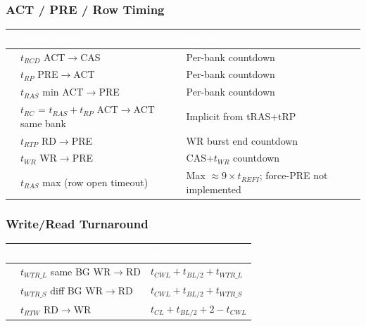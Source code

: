 \documentclass[11pt,a4paper]{article}
\newcommand{\THead}[1]{\cellcolor{navy}\textcolor{white}{\small\textbf{#1}}}
\newcommand{\RA}{\rowcolor{lgray}}
\newcommand{\RB}{\rowcolor{sky!30}}
\newcommand{\cmark}{\textcolor{grn}{\ding{51}}}
\newcommand{\xmark}{\textcolor{red}{\ding{55}}}
\begin{document}
\subsubsection*{ACT / PRE / Row Timing}
\begin{center}
\begin{tabularx}{\linewidth}{@{} c l X @{}}
\toprule
\THead{} & \THead{Constraint} & \THead{Notes} \\
\midrule
\RA\cmark & $t_{RCD}$ ACT$\to$CAS & Per-bank countdown \\
\RB\cmark & $t_{RP}$ PRE$\to$ACT & Per-bank countdown \\
\RA\cmark & $t_{RAS}$ min ACT$\to$PRE & Per-bank countdown \\
\RB\cmark & $t_{RC}$ = $t_{RAS}+t_{RP}$ ACT$\to$ACT same bank &
  Implicit from tRAS+tRP \\
\RA\cmark & $t_{RTP}$ RD$\to$PRE & WR burst end countdown \\
\RB\cmark & $t_{WR}$ WR$\to$PRE & CAS+$t_{WR}$ countdown \\
\RA\xmark & $t_{RAS}$ max (row open timeout) &
  Max $\approx9\times t_{REFI}$; force-PRE not implemented \\
\bottomrule
\end{tabularx}
\end{center}

\subsubsection*{Write/Read Turnaround}
\begin{center}
\begin{tabularx}{\linewidth}{@{} c l X @{}}
\toprule
\THead{} & \THead{Constraint} & \THead{Notes} \\
\midrule
\RA\cmark & $t_{WTR\_L}$ same BG WR$\to$RD &
  $t_{CWL}+t_{BL/2}+t_{WTR\_L}$ \\
\RB\cmark & $t_{WTR\_S}$ diff BG WR$\to$RD &
  $t_{CWL}+t_{BL/2}+t_{WTR\_S}$ \\
\RA\cmark & $t_{RTW}$ RD$\to$WR &
  $t_{CL}+t_{BL/2}+2-t_{CWL}$ \\
\bottomrule
\end{tabularx}
\end{center}
\end{document}
